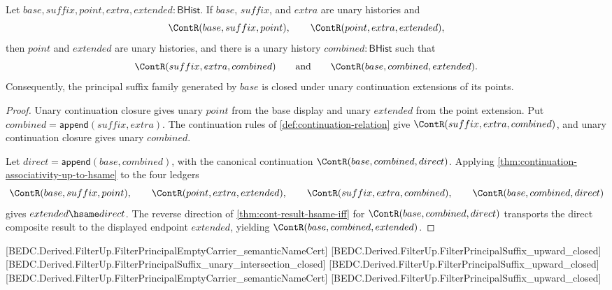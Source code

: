 \begin{theorem}
\label{thm:filter-principal-suffix-upward-closed}
Let $base,suffix,point,extra,extended:\mathsf{BHist}$. If $base$, $suffix$,
and $extra$ are unary histories and
$$
\ContR(base,suffix,point),\qquad
\ContR(point,extra,extended),
$$
then $point$ and $extended$ are unary histories, and there is a unary history
$combined:\mathsf{BHist}$ such that
$$
\ContR(suffix,extra,combined)\qquad\text{and}\qquad
\ContR(base,combined,extended).
$$
Consequently, the principal suffix family generated by $base$ is closed under
unary continuation extensions of its points.
\end{theorem}
\begin{proof}
Unary continuation closure gives unary $point$ from the base display and unary
$extended$ from the point extension. Put
$combined=\mathsf{append}(suffix,extra)$. The continuation rules of
\autoref{def:continuation-relation} give $\ContR(suffix,extra,combined)$, and
unary continuation closure gives unary $combined$.

Let $direct=\mathsf{append}(base,combined)$, with the canonical continuation
$\ContR(base,combined,direct)$. Applying
\autoref{thm:continuation-associativity-up-to-hsame} to the four ledgers
$$
\ContR(base,suffix,point),\qquad
\ContR(point,extra,extended),\qquad
\ContR(suffix,extra,combined),\qquad
\ContR(base,combined,direct)
$$
gives $extended\hsame direct$. The reverse direction of
\autoref{thm:cont-result-hsame-iff} for $\ContR(base,combined,direct)$
transports the direct composite result to the displayed endpoint $extended$,
yielding $\ContR(base,combined,extended)$.
\end{proof}

[BEDC.Derived.FilterUp.FilterPrincipalEmptyCarrier\_semanticNameCert]
[BEDC.Derived.FilterUp.FilterPrincipalSuffix\_upward\_closed]
[BEDC.Derived.FilterUp.FilterPrincipalSuffix\_unary\_intersection\_closed]
[BEDC.Derived.FilterUp.FilterPrincipalSuffix\_upward\_closed]
[BEDC.Derived.FilterUp.FilterPrincipalEmptyCarrier\_semanticNameCert]
[BEDC.Derived.FilterUp.FilterPrincipalSuffix\_upward\_closed]

